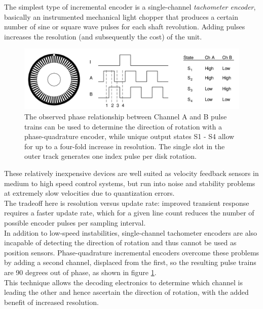 The simplest type of incremental encoder is a single-channel
\textit{tachometer encoder}, basically an instrumented mechanical
light chopper that produces a certain number of sine or square wave
pulses for each shaft revolution. Adding pulses increases the resolution
(and subsequently the cost) of the unit.
\begin{figure} [h]
  \begin{center}
    \includegraphics[width=\textwidth]{img/incremental_encoder.png}
    \caption{The observed phase relationship between Channel A and B
      pulse trains can be used to determine
      the direction of rotation with a phase-quadrature encoder,
      while unique output states S1 - S4 allow for up to a
      four-fold increase in resolution. The single slot in the outer
      track generates one index pulse per disk rotation.
    }
    \label{fig:incremental_encoder}
  \end{center}
\end{figure}
These relatively inexpensive devices are well suited as velocity feedback
sensors in medium to high speed control systems, but run into noise and
stability problems at extremely slow velocities due to quantization errors.
\\
The tradeoff here is resolution versus update rate: improved transient
response requires a faster update rate, which for a given line count reduces
the number of possible encoder pulses per sampling interval. 
\\
In addition to low-speed instabilities, single-channel tachometer encoders
are also incapable of detecting the direction of rotation and thus cannot
be used as position sensors. Phase-quadrature incremental encoders overcome
these problems by adding a second channel, displaced from the
first, so the resulting pulse trains are 90 degrees out of phase, as shown
in figure \ref{fig:incremental_encoder}.
\\
This technique allows the decoding electronics to determine which channel
is leading the other and hence ascertain the direction of rotation, with the
added benefit of increased resolution.
\\
